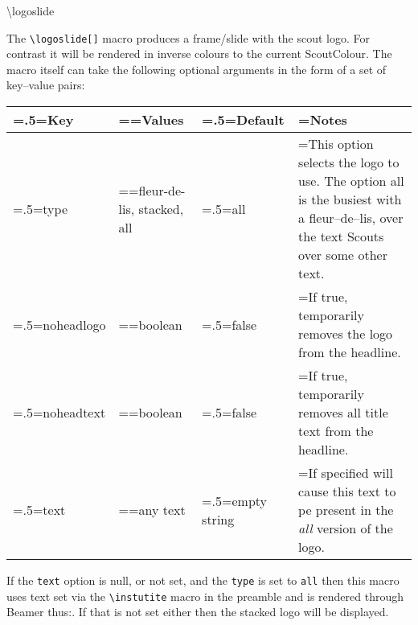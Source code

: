 \begin{frame}{\textbackslash{}logoslide}
\parbox{\textwidth}{\scriptsize The {\tt \textbackslash{}logoslide[]} macro produces a frame/slide with the scout logo. For contrast it will be rendered in inverse colours to the current ScoutColour. The macro itself can take the following optional arguments in the form of a set of key--value pairs:}

{
\Tiny
\begin{tabularx}{\textwidth}{>{\hsize=.5\hsize\linewidth=\hsize}X
                                >{\hsize=\hsize\linewidth=\hsize}X
                                >{\hsize=.5\hsize\linewidth=\hsize}X
                                >{\hsize=2\hsize\linewidth=\hsize}X}
\toprule
\textbf{Key}&\textbf{Values}&\textbf{Default}&\textbf{Notes}\\
\midrule
type&fleur-de-lis, stacked, all&all&This option selects the logo to use. The option all is the busiest with a fleur--de--lis, over the text Scouts over some other text.\\
noheadlogo&\textcolor{ScoutPurple}{boolean}&\textcolor{ScoutPurple}{false}&If true, temporarily removes the logo from the headline.\\
noheadtext&\textcolor{ScoutPurple}{boolean}&\textcolor{ScoutPurple}{false}&If true, temporarily removes all title text from the headline.\\
text&\textcolor{ScoutPurple}{any text}&\textcolor{ScoutPurple}{empty string}&If specified will cause this text to pe present in the \emph{all} version of the logo.\\
\bottomrule
\end{tabularx}
}

\parbox{\textwidth}{\scriptsize If the {\tt text} option is null, or not set, and the {\tt type} is set to {\tt all} then this macro uses text set via the {\tt \textbackslash{}instutite} macro in the preamble and is rendered through Beamer thus:. If that is not set either then the stacked logo will be displayed.}
\end{frame}

